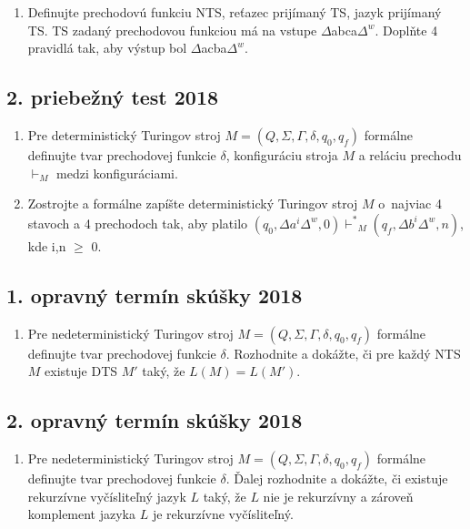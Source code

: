 \documentclass[11pt,a4paper]{article}
\begin{document}
		\begin{enumerate}
			\item Definujte prechodovú funkciu NTS, reťazec prijímaný TS, jazyk prijímaný TS. TS zadaný prechodovou funkciou má na vstupe $\Delta$abca$\Delta^{w}$. Doplňte 4 pravidlá tak, aby výstup bol $\Delta$acba$\Delta^w$.
		\end{enumerate}

		\subsection{2. priebežný test 2018}

		\begin{enumerate}
			\item Pre deterministický Turingov stroj $M = (Q, \Sigma, \Gamma, \delta, q_0, q_f)$ formálne definujte tvar prechodovej funkcie $\delta$, konfiguráciu stroja $M$ a reláciu prechodu $\vdash_M$ medzi konfiguráciami.

			\item Zostrojte a formálne zapíšte deterministický Turingov stroj $M$ o~najviac 4 stavoch a 4 prechodoch tak, aby platilo $(q_0, \Delta a^i\Delta^w, 0) {\vdash^*}_M (q_f, \Delta b^i\Delta^w, n)$, kde i,n $\geq$ 0.
		\end{enumerate}
	
		\subsection{1. opravný termín skúšky 2018}
	
		\begin{enumerate}
			\item Pre nedeterministický Turingov stroj $M = (Q, \Sigma, \Gamma, \delta, q_0, q_f)$ formálne definujte tvar prechodovej funkcie $\delta$. Rozhodnite a dokážte, či pre každý NTS $M$ existuje DTS $M'$ taký, že $L(M) = L(M')$.
		\end{enumerate}
		
		\subsection{2. opravný termín skúšky 2018}
		
		\begin{enumerate}
			\item Pre nedeterministický Turingov stroj $M = (Q, \Sigma, \Gamma, \delta, q_0, q_f)$ formálne definujte tvar prechodovej funkcie $\delta$. Ďalej rozhodnite a dokážte, či existuje rekurzívne vyčísliteľný jazyk $L$ taký, že $L$ nie je rekurzívny a zároveň komplement jazyka $L$ je rekurzívne vyčísliteľný.
		\end{enumerate}
\end{document}
